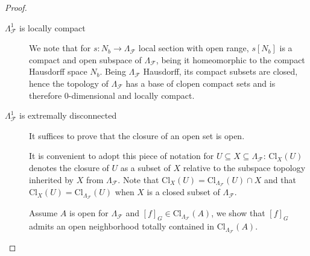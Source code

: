 \documentclass[10pt,a4paper]{amsart}
\newcommand{\F}{\mathcal{F}}
\newcommand{\bool}[1]{\mathsf{#1}}
\newcommand{\bp}[1]{\left\lbrace #1 \right\rbrace}
\begin{document}
\begin{proof}
\begin{description}
%
% 
% 
%
%


\item[$\Lambda^1_\F$ is locally compact] 
We note that for $s:N_b\to\Lambda_\F$ local section with open range, $s[N_b]$ is a compact and open subspace of $\Lambda_\F$, being it homeomorphic to the compact Hausdorff space $N_b$.
Being $\Lambda_\F$ Hausdorff, its compact subsets are closed, hence the topology of $\Lambda_\F$ has a base of clopen compact sets and is therefore $0$-dimensional and locally compact. 

\item[$\Lambda^1_\F$ is extremally disconnected] It suffices to prove that the closure of an open set is open.

It is convenient to adopt this piece of notation for $U\subseteq X\subseteq\Lambda_\F$: $\mathrm{Cl}_X(U)$ denotes the closure of $U$ as a subset of $X$ relative to the subspace topology inherited by $X$ from $\Lambda_\F$. Note that $\mathrm{Cl}_X(U)=\mathrm{Cl}_{\Lambda_\F}(U)\cap X$ and that  $\mathrm{Cl}_X(U)=\mathrm{Cl}_{\Lambda_\F}(U)$ when $X$ is a closed subset of $\Lambda_\F$.

Assume $A$ is open for $\Lambda_\F$ and $[f]_G\in\mathrm{Cl}_{\Lambda_\F}(A)$, we show that $[f]_G$ admits an open neighborhood totally contained in $\mathrm{Cl}_{\Lambda_\F}(A)$. 


\end{description}
\end{proof}
\end{document}
